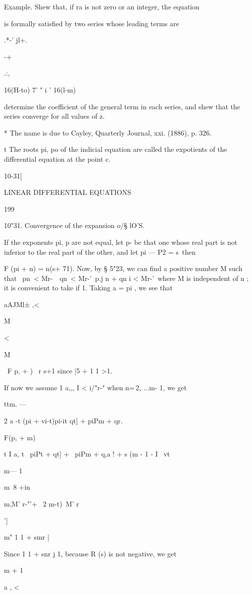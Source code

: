Example. Shew that, if ra is not zero or an integer, the equation

is formally satisfied by two series whose leading terms are

.*-' jl+.

-+

.:,

16(H-to) 7' " i ' 16(l-m)

determine the coefficient of the general term in each series, and shew
that the series converge for all values of z.

* The name is due to Cayley, Quarterly Journal, xxi. (1886), p. 326.

t The roots pi, po of the indicial equation are called the expotients
of the differential equation at the point c.

10-31]

LINEAR DIFFERENTIAL EQUATIONS

199

10"31. Convergence of the expansion o/§ lO'S.

If the exponents pi, p are not equal, let p- be that one whose real
part is not inferior to the real part of the other, and let pi — P2 =
s\ then

F (pi + n) = n(s+ 71). Now, by § 5"23, we can find a positive number M
such that \ pn\ < Mr-\ \ qn\ < Mr-'\ p.j n + qn i < Mr-'\ where M is
independent of n ; it is convenient to take if 1. Taking a = pi , we
see that

aAJMl± ,<

M

<

M

\ F p, + ) \ r s+1 since |5 + 1 1 >1.

If now we assume 1 a,,, I < i/"r-" when n=\,2, ...m- 1, we get

ttm. —

2 a -t (pi + vi-t)pi-it qt] + piPm + qr.

F(p, + m)

t I a, t \ piPt + qt] + \ piPm + q,a ! + s (m - 1 - I \ vt

m— 1

m\ 8 +in\

m,M' r-"'+ \ 2 m-t)\ M' r

']

m" 1 1 + smr |

Since 1 1 + snr j 1, because R (s) is not negative, we get

m + 1

a , <

